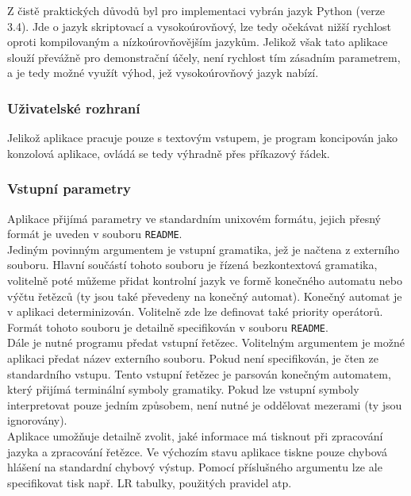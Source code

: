 Z čistě praktických důvodů byl pro implementaci vybrán jazyk Python
(verze 3.4). Jde o jazyk skriptovací a vysokoúrovňový, lze tedy
očekávat nižší rychlost oproti kompilovaným a nízkoúrovňovějším jazykům.
Jelikož však tato aplikace slouží převážně pro demonstrační účely,
není rychlost tím zásadním parametrem, a je tedy možné využít
výhod, jež vysokoúrovňový jazyk nabízí.

\subsubsection*{Uživatelské rozhraní}

Jelikož aplikace pracuje pouze s textovým vstupem, je program koncipován
jako konzolová aplikace, ovládá se tedy výhradně přes příkazový řádek.

\subsubsection*{Vstupní parametry}

Aplikace přijímá parametry ve standardním unixovém formátu, jejich přesný
formát je uveden v souboru \texttt{README}.\\

Jediným povinným argumentem je vstupní gramatika, jež je načtena z
externího souboru. Hlavní součástí tohoto souboru je řízená bezkontextová gramatika,
volitelně poté můžeme přidat kontrolní jazyk ve formě konečného automatu nebo
výčtu řetězců (ty jsou také převedeny na konečný automat). Konečný
automat je v aplikaci determinizován.
Volitelně zde lze definovat také priority operátorů.
Formát tohoto souboru je detailně specifikován v souboru \texttt{README}.\\

Dále je nutné programu předat vstupní řetězec. Volitelným argumentem je
možné aplikaci předat název externího souboru. Pokud není specifikován,
je čten ze standardního vstupu. Tento vstupní řetězec je parsován konečným
automatem, který přijímá terminální symboly gramatiky.
Pokud lze vstupní symboly interpretovat pouze jedním způsobem, není nutné
je oddělovat mezerami (ty jsou ignorovány).\\

Aplikace umožňuje detailně zvolit, jaké informace má tisknout
při zpracování jazyka a zpracování řetězce. Ve výchozím stavu
aplikace tiskne pouze chybová hlášení na standardní chybový výstup.
Pomocí příslušného argumentu lze ale specifikovat tisk např. LR tabulky,
použitých pravidel atp.\\

